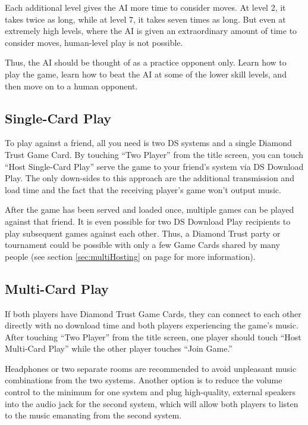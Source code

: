 \documentclass[8pt]{extbook}
\begin{document}
Each additional level gives the AI more time to consider moves.  At level 2, it takes twice as long, while at level 7, it takes seven times as long.  But even at extremely high levels, where the AI is given an extraordinary amount of time to consider moves, human-level play is not possible.

Thus, the AI should be thought of as a practice opponent only.  Learn how to play the game, learn how to beat the AI at some of the lower skill levels, and then move on to a human opponent.  

\subsection{Single-Card Play}
\label{sec:singleCard}
To play against a friend, all you need is two DS systems and a single Diamond Trust Game Card.  By touching ``Two Player'' from the title screen, you can touch ``Host Single-Card Play'' serve the game to your friend's system via DS Download Play.  The only down-sides to this approach are the additional transmission and load time and the fact that the receiving player's game won't output music.

After the game has been served and loaded once, multiple games can be played against that friend.  It is even possible for two DS Download Play recipients to play subsequent games against each other.  Thus, a Diamond Trust party or tournament could be possible with only a few Game Cards shared by many people (see section \ref{sec:multiHosting} on page \pageref{sec:multiHosting} for more information).
 

\subsection{Multi-Card Play}
If both players have Diamond Trust Game Cards, they can connect to each other directly with no download time and both players experiencing the game's music.  After touching ``Two Player'' from the title screen, one player should touch ``Host Multi-Card Play'' while the other player touches ``Join Game.''

Headphones or two separate rooms are recommended to avoid unpleasant music combinations from the two systems.  Another option is to reduce the volume control to the minimum for one system and plug high-quality, external speakers into the audio jack for the second system, which will allow both players to listen to the music emanating from the second system.
\end{document}
